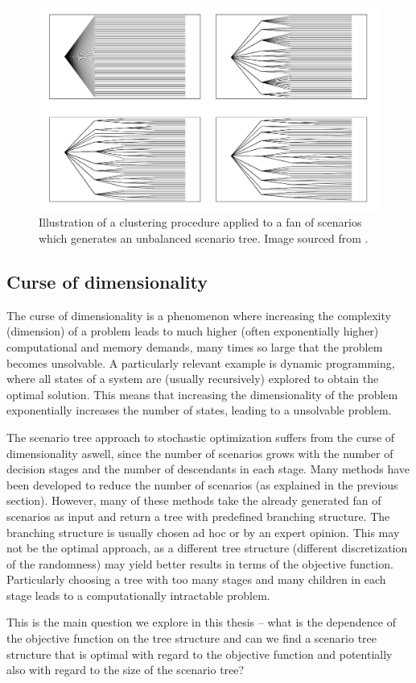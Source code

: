 \begin{figure}
  \includegraphics[width=\linewidth]{../img/fan_of_scenarios_clustering.png}
  \caption{Illustration of a clustering procedure applied to a fan of scenarios which generates an unbalanced scenario tree.  Image sourced from \cite[Figure 5]{fan_of_scenarios}.}
  \label{fig:fan_of_scenarios_clustering}
\end{figure}
\subsection{Curse of dimensionality}
\label{section:curse_od_dimensionality}
The curse of dimensionality is a phenomenon where increasing the complexity (dimension) of a problem leads to much higher (often exponentially higher) computational and memory demands, many times so large that the problem becomes unsolvable. A particularly relevant example is dynamic programming, where all states of a system are (usually recursively) explored to obtain the optimal solution. This means that increasing the dimensionality of the problem exponentially increases the number of states, leading to a unsolvable problem.

The scenario tree approach to stochastic optimization suffers from the curse of dimensionality aswell, since the number of scenarios grows with the number of decision stages and the number of descendants in each stage. Many methods have been developed to reduce the number of scenarios (as explained in the previous section). However,  many of these methods take the already generated fan of scenarios as input and return a tree with predefined branching structure. The branching structure is usually chosen ad hoc or by an expert opinion. This may not be the optimal approach, as a different tree structure (different discretization of the randomness) may yield better results in terms of the objective function. Particularly choosing a tree with too many stages and many children in each stage leads to a computationally intractable problem.

This is the main question we explore in this thesis -- what is the dependence of the objective function on the tree structure and can we find a scenario tree structure that is optimal with regard to the objective function and potentially also with regard to the size of the scenario tree?
